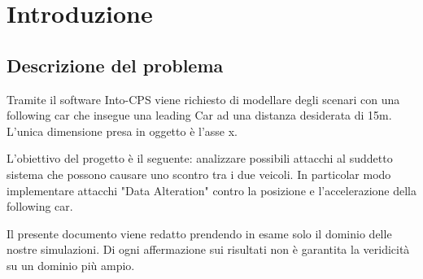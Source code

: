 \section{Introduzione}
\subsection{Descrizione del problema}
Tramite il software Into-CPS viene richiesto di modellare degli scenari con una following car che insegue una leading Car ad una distanza desiderata di 15m. L'unica dimensione presa in oggetto è l'asse x.

L'obiettivo del progetto è il seguente: analizzare possibili attacchi al suddetto sistema che possono causare uno scontro tra i due veicoli. In particolar modo implementare attacchi "Data Alteration" contro la posizione e l'accelerazione della following car.

Il presente documento viene redatto prendendo in esame solo il dominio delle nostre simulazioni. Di ogni affermazione sui risultati non è garantita la veridicità su un dominio più ampio.